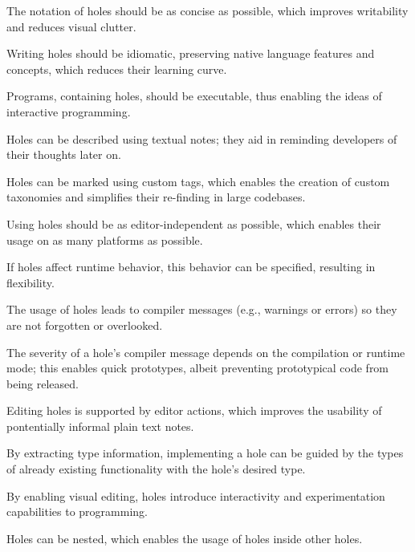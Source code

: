 \begin{properties}
    \item The notation of holes should be as concise as possible, which improves writability and reduces visual clutter.\label{hp:concise}
    \item Writing holes should be idiomatic, preserving native language features and concepts, which reduces their learning curve.\label{hp:idiomatic}
    \item Programs, containing holes, should be executable, thus enabling the ideas of interactive programming.\label{hp:executable}
    \item Holes can be described using textual notes; they aid in reminding developers of their thoughts later on.\label{hp:prose-message}
    \item Holes can be marked using custom tags, which enables the creation of custom taxonomies and simplifies their re-finding in large codebases.\label{hp:taggable}
    \item Using holes should be as editor-independent as possible, which enables their usage on as many platforms as possible.\label{hp:editor-independence}
    \item If holes affect runtime behavior, this behavior can be specified, resulting in flexibility.\label{hp:runtime-behavior}
    \item The usage of holes leads to compiler messages (e.g., warnings or errors) so they are not forgotten or overlooked.\label{hp:compile-warnings}
    \item The severity of a hole's compiler message depends on the compilation or runtime mode; this enables quick prototypes, albeit preventing prototypical code from being released.\label{hp:severity-modes}
    \item Editing holes is supported by editor actions, which improves the usability of pontentially informal plain text notes.\label{hp:supported-editor-actions}
    \item By extracting type information, implementing a hole can be guided by the types of already existing functionality with the hole's desired type.\label{hp:matchable-via-types}
    \item By enabling visual editing, holes introduce interactivity and experimentation capabilities to programming.\label{hp:visually-editable}
    \item Holes can be nested, which enables the usage of holes inside other holes.\label{hp:nestable}
\end{properties}
